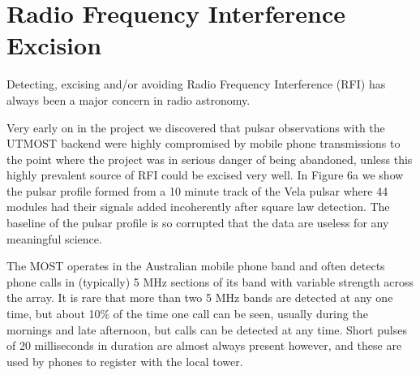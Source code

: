 \section{Radio Frequency Interference Excision}  

Detecting, excising and/or avoiding Radio Frequency Interference (RFI) has always been a major concern in radio astronomy. 

Very early on in the project we discovered that pulsar observations with the UTMOST backend were highly compromised by mobile phone transmissions to the point where the project was in serious danger of being abandoned, unless this highly prevalent source of RFI could be excised very well. In Figure 6a we show the pulsar profile formed from a 10 minute track of the Vela pulsar where 44 modules had their signals added incoherently after square law detection. The baseline of the pulsar profile is so corrupted that the data are useless for any meaningful science.

The MOST operates in the Australian mobile phone band and often detects phone calls in (typically) 5 MHz sections of its band with variable strength across the array. It is rare that more than two 5 MHz bands are detected at any one time, but about 10\% of the time one call can be seen, usually during the mornings and late afternoon, but calls can be detected at any time. Short pulses of 20 milliseconds in duration are almost always present however, and these are used by phones to register with the local tower.

  